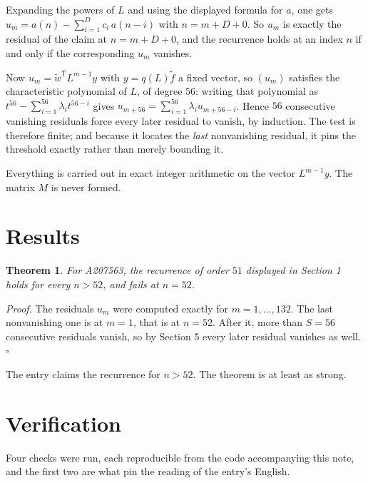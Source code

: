 \documentclass[11pt]{article}
\newtheorem{theorem}{Theorem}
\theoremstyle{definition}
\begin{document}
Expanding the powers of $L$ and using the displayed formula for $a$, one gets $u_m = a(n) - \sum_{i=1}^{D} c_i\,a(n-i)$ with $n = m + D + 0$. So $u_m$ is exactly the residual of the claim at $n = m + D + 0$, and the recurrence holds at an index $n$ if and only if the corresponding $u_m$ vanishes.

Now $u_m = \tilde w^{\mathsf T} L^{m-1} y$ with $y = q(L)\tilde f$ a fixed vector, so $(u_m)$ satisfies the characteristic polynomial of $L$, of degree $56$: writing that polynomial as $t^{56} - \sum_{i=1}^{56} \lambda_i t^{56-i}$ gives $u_{m+56} = \sum_{i=1}^{56} \lambda_i u_{m+56-i}$. Hence $56$ consecutive vanishing residuals force every later residual to vanish, by induction. The test is therefore finite; and because it locates the {\itshape last} nonvanishing residual, it pins the threshold exactly rather than merely bounding it.

Everything is carried out in exact integer arithmetic on the vector $L^{m-1}y$. The matrix $M$ is never formed.

\section{Results}

\begin{theorem} For A207563, the recurrence of order $51$ displayed in Section 1 holds for every $n > 52$, and fails at $n = 52$.\end{theorem}

{\itshape Proof.} The residuals $u_m$ were computed exactly for $m = 1,\dots,132$. The last nonvanishing one is at $m = 1$, that is at $n = 52$. After it, more than $S = 56$ consecutive residuals vanish, so by Section 5 every later residual vanishes as well. $\square$

The entry claims the recurrence for $n > 52$. The theorem is at least as strong.

\section{Verification}

Four checks were run, each reproducible from the code accompanying this note, and the first two are what pin the reading of the entry's English.
\end{document}
